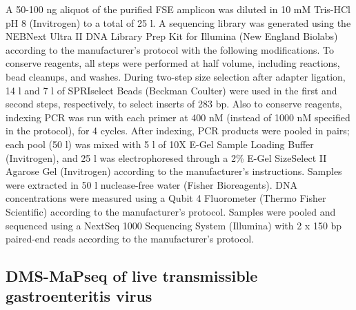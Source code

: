 \documentclass[main.tex]{subfiles}
\begin{document}
A 50-100 ng aliquot of the purified FSE amplicon was diluted in 10 mM Tris-HCl pH 8 (Invitrogen) to a total of 25 \textmu l.
A sequencing library was generated using the NEBNext Ultra II DNA Library Prep Kit for Illumina (New England Biolabs) according to the manufacturer's protocol with the following modifications.
To conserve reagents, all steps were performed at half volume, including reactions, bead cleanups, and washes.
During two-step size selection after adapter ligation, 14 \textmu l and 7 \textmu l of SPRIselect Beads (Beckman Coulter) were used in the first and second steps, respectively, to select inserts of 283 bp.
Also to conserve reagents, indexing PCR was run with each primer at 400 nM (instead of 1000 nM specified in the protocol), for 4 cycles.
After indexing, PCR products were pooled in pairs; each pool (50 \textmu l) was mixed with 5 \textmu l of 10X E-Gel Sample Loading Buffer (Invitrogen), and 25 \textmu l was electrophoresed through a 2\% E-Gel SizeSelect II Agarose Gel (Invitrogen) according to the manufacturer's instructions.
Samples were extracted in 50 \textmu l nuclease-free water (Fisher Bioreagents).
DNA concentrations were measured using a Qubit 4 Fluorometer (Thermo Fisher Scientific) according to the manufacturer's protocol.
Samples were pooled and sequenced using a NextSeq 1000 Sequencing System (Illumina) with 2 x 150 bp paired-end reads according to the manufacturer's protocol.


\subsection{DMS-MaPseq of live transmissible gastroenteritis virus}
\end{document}
